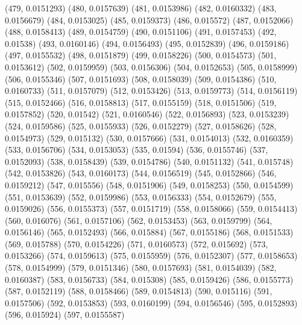 {					(479, 0.0151293)
					(480, 0.0157639)
					(481, 0.0153986)
					(482, 0.0160332)
					(483, 0.0156679)
					(484, 0.0153025)
					(485, 0.0159373)
					(486, 0.015572)
					(487, 0.0152066)
					(488, 0.0158413)
					(489, 0.0154759)
					(490, 0.0151106)
					(491, 0.0157453)
					(492, 0.01538)
					(493, 0.0160146)
					(494, 0.0156493)
					(495, 0.0152839)
					(496, 0.0159186)
					(497, 0.0155532)
					(498, 0.0151879)
					(499, 0.0158226)
					(500, 0.0154573)
					(501, 0.0153612)
					(502, 0.0159959)
					(503, 0.0156306)
					(504, 0.0152653)
					(505, 0.0158999)
					(506, 0.0155346)
					(507, 0.0151693)
					(508, 0.0158039)
					(509, 0.0154386)
					(510, 0.0160733)
					(511, 0.0157079)
					(512, 0.0153426)
					(513, 0.0159773)
					(514, 0.0156119)
					(515, 0.0152466)
					(516, 0.0158813)
					(517, 0.0155159)
					(518, 0.0151506)
					(519, 0.0157852)
					(520, 0.01542)
					(521, 0.0160546)
					(522, 0.0156893)
					(523, 0.0153239)
					(524, 0.0159586)
					(525, 0.0155933)
					(526, 0.0152279)
					(527, 0.0158626)
					(528, 0.0154973)
					(529, 0.015132)
					(530, 0.0157666)
					(531, 0.0154013)
					(532, 0.0160359)
					(533, 0.0156706)
					(534, 0.0153053)
					(535, 0.01594)
					(536, 0.0155746)
					(537, 0.0152093)
					(538, 0.0158439)
					(539, 0.0154786)
					(540, 0.0151132)
					(541, 0.015748)
					(542, 0.0153826)
					(543, 0.0160173)
					(544, 0.0156519)
					(545, 0.0152866)
					(546, 0.0159212)
					(547, 0.015556)
					(548, 0.0151906)
					(549, 0.0158253)
					(550, 0.0154599)
					(551, 0.0153639)
					(552, 0.0159986)
					(553, 0.0156333)
					(554, 0.0152679)
					(555, 0.0159026)
					(556, 0.0155373)
					(557, 0.0151719)
					(558, 0.0158066)
					(559, 0.0154413)
					(560, 0.016076)
					(561, 0.0157106)
					(562, 0.0153453)
					(563, 0.0159799)
					(564, 0.0156146)
					(565, 0.0152493)
					(566, 0.015884)
					(567, 0.0155186)
					(568, 0.0151533)
					(569, 0.015788)
					(570, 0.0154226)
					(571, 0.0160573)
					(572, 0.015692)
					(573, 0.0153266)
					(574, 0.0159613)
					(575, 0.0155959)
					(576, 0.0152307)
					(577, 0.0158653)
					(578, 0.0154999)
					(579, 0.0151346)
					(580, 0.0157693)
					(581, 0.0154039)
					(582, 0.0160387)
					(583, 0.0156733)
					(584, 0.015308)
					(585, 0.0159426)
					(586, 0.0155773)
					(587, 0.0152119)
					(588, 0.0158466)
					(589, 0.0154813)
					(590, 0.015116)
					(591, 0.0157506)
					(592, 0.0153853)
					(593, 0.0160199)
					(594, 0.0156546)
					(595, 0.0152893)
					(596, 0.015924)
					(597, 0.0155587)
}
